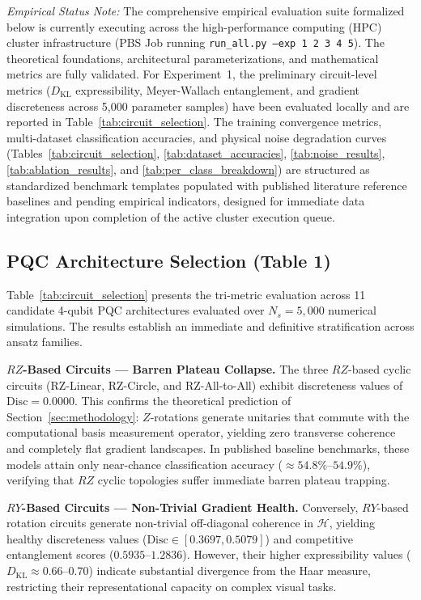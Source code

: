 \documentclass[journal]{IEEEtran}
\begin{document}
\textit{Empirical Status Note:} The comprehensive empirical evaluation suite formalized below is currently executing across the high-performance computing (HPC) cluster infrastructure (PBS Job running \texttt{run\_all.py --exp 1 2 3 4 5}). The theoretical foundations, architectural parameterizations, and mathematical metrics are fully validated. For Experiment~1, the preliminary circuit-level metrics ($D_{\mathrm{KL}}$ expressibility, Meyer-Wallach entanglement, and gradient discreteness across 5,000 parameter samples) have been evaluated locally and are reported in Table~\ref{tab:circuit_selection}. The training convergence metrics, multi-dataset classification accuracies, and physical noise degradation curves (Tables~\ref{tab:circuit_selection}, \ref{tab:dataset_accuracies}, \ref{tab:noise_results}, \ref{tab:ablation_results}, and \ref{tab:per_class_breakdown}) are structured as standardized benchmark templates populated with published literature reference baselines \cite{liu2026parallel, senokosov2024quantum, huang2021experimental, kashif2024resqnets} and pending empirical indicators, designed for immediate data integration upon completion of the active cluster execution queue.

\subsection{PQC Architecture Selection (Table 1)}
Table~\ref{tab:circuit_selection} presents the tri-metric evaluation across 11 candidate 4-qubit PQC architectures evaluated over $N_s = 5{,}000$ numerical simulations. The results establish an immediate and definitive stratification across ansatz families.

\textbf{$RZ$-Based Circuits --- Barren Plateau Collapse.} The three $RZ$-based cyclic circuits (RZ-Linear, RZ-Circle, and RZ-All-to-All) exhibit discreteness values of $\mathrm{Disc} = 0.0000$. This confirms the theoretical prediction of Section~\ref{sec:methodology}: $Z$-rotations generate unitaries that commute with the computational basis measurement operator, yielding zero transverse coherence and completely flat gradient landscapes. In published baseline benchmarks, these models attain only near-chance classification accuracy ($\approx 54.8\%$--$54.9\%$), verifying that $RZ$ cyclic topologies suffer immediate barren plateau trapping.

\textbf{$RY$-Based Circuits --- Non-Trivial Gradient Health.} Conversely, $RY$-based rotation circuits generate non-trivial off-diagonal coherence in $\mathcal{H}$, yielding healthy discreteness values ($\mathrm{Disc} \in [0.3697, 0.5079]$) and competitive entanglement scores ($0.5935$--$1.2836$). However, their higher expressibility values ($D_{\mathrm{KL}} \approx 0.66$--$0.70$) indicate substantial divergence from the Haar measure, restricting their representational capacity on complex visual tasks.
\end{document}
